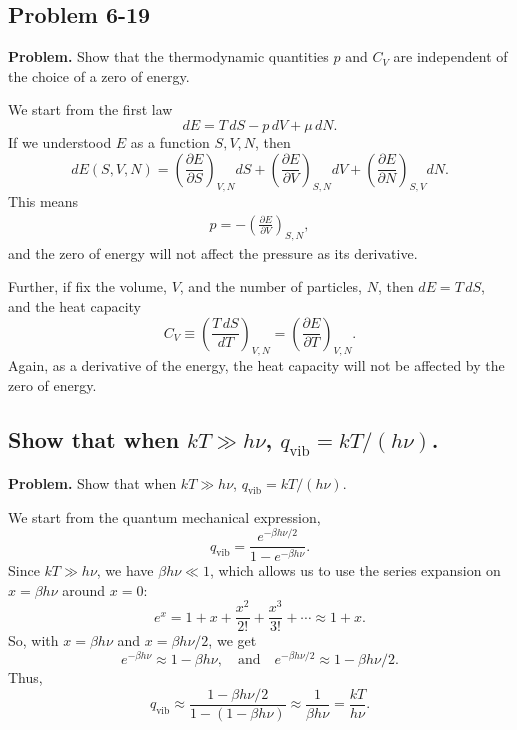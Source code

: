 \documentclass[twocolumn, 10pt]{article}
\numberwithin{equation}{section}
\newenvironment{problem}
{\par\medskip \color{problemblue}
  \textbf{Problem. }\ignorespaces}
{\medskip}
\newenvironment{solution}[1][\empty]
{\par\medskip\sffamily
  \textbf{\ifx\empty#1{Solution.}\relax\else{#1}\fi} \ignorespaces}
{\medskip}
\begin{document}
\subsection{Problem 6-19}

\begin{problem}
Show that the thermodynamic quantities $p$ and $C_V$
are independent of the choice of a zero of energy.
\end{problem}

\begin{solution}
We start from the first law
$$dE = T \, dS - p \, dV + \mu \, dN.$$
If we understood $E$ as a function $S, V, N$,
then
$$
  dE(S, V, N)
  =
   \left( \frac{\partial E}{\partial S} \right)_{V, N} dS
  +\left( \frac{\partial E}{\partial V} \right)_{S, N} dV
  +\left( \frac{\partial E}{\partial N} \right)_{S, V} dN
  .
$$
This means
\begin{align*}
  p = -\left( \frac{\partial E}{\partial V} \right)_{S, N},
\end{align*}
and the zero of energy will not affect the pressure as its derivative.

Further, if fix the volume, $V$, and the number of particles, $N$,
then $dE = T \, dS$,
and the heat capacity
$$
  C_V \equiv \left( \frac{ T \, dS } { dT } \right)_{V, N}
  = \left( \frac{ \partial E } { \partial T } \right)_{V, N}.
$$
Again, as a derivative of the energy,
the heat capacity will not be affected by the zero of energy.
\end{solution}


\subsection{Show that when $kT \gg h\nu$, $q_\mathrm{vib} = kT/(h\nu)$.}

\begin{problem}
Show that when $kT \gg h\nu$, $q_\mathrm{vib} = kT/(h\nu)$.
\end{problem}

\begin{solution}
We start from the quantum mechanical expression,
$$
q_\mathrm{vib} = \frac{e^{-\beta h\nu/2}}{1- e^{-\beta h\nu}}.
$$
Since $kT \gg h\nu$, we have $\beta h\nu \ll 1$,
which allows us to use the series expansion on $x = \beta h \nu$
around $x = 0$:
%
$$
e^x = 1 + x + \frac{x^2}{2!} + \frac{x^3}{3!} + \cdots \approx 1 + x.
$$
%
So, with $x = \beta h \nu$ and $x = \beta h \nu/2$, we get
$$
e^{-\beta h \nu} \approx 1 - \beta h \nu,
\quad
\mbox{and}
\quad
e^{-\beta h \nu/2} \approx 1 - \beta h \nu/2.
$$
Thus,
$$q_\mathrm{vib} \approx
\frac{1-\beta h\nu/2}{1- (1-\beta h\nu)}
\approx
\frac{1}{\beta h\nu} = \frac{kT}{h\nu}.
$$
\end{solution}
\end{document}
